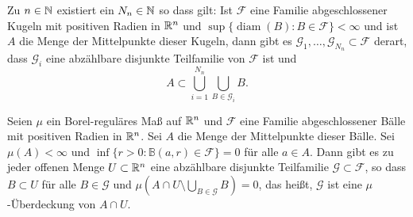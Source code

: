 \documentclass[a4paper,twoside,DIV15,BCOR12mm]{scrbook}
\DeclareMathOperator{\diam}{diam}
\begin{document}
\begin{satz}[Besicovitch]
\label{satz:2.8}
Zu $n\in\mathbb{N}$ existiert ein $N_n\in\mathbb{N}$ so dass gilt: Ist $\mathcal F$ eine Familie abgeschlossener Kugeln mit positiven Radien in $\mathbb{R}^n$ und $\sup\{\diam(B):B\in\mathcal F\}<\infty$ und ist $A$ die Menge der Mittelpunkte dieser Kugeln, dann gibt es $\mathcal G_1,\ldots,\mathcal G_{N_n}\subset \mathcal F$ derart, dass $\mathcal G_i$ eine abzählbare disjunkte Teilfamilie von $\mathcal F$ ist und
\[
A\subset \bigcup_{i=1}^{N_n} \bigcup_{B\in\mathcal G_i}B.
\]
\end{satz}

\begin{korollar}
\label{kor:2.9}
Seien $\mu$ ein Borel-reguläres Maß auf $\mathbb{R}^n$ und $\mathcal F$ eine Familie abgeschlossener Bälle mit positiven Radien in $\mathbb{R}^n$. Sei $A$ die Menge der Mittelpunkte dieser Bälle. Sei $\mu(A)<\infty$ und $\inf\{r>0: \mathbb B(a,r)\in\mathcal F\}=0$ für alle $a\in A$. Dann gibt es zu jeder offenen Menge $ U \subset\mathbb{R}^n$ eine abzählbare disjunkte Teilfamilie $\mathcal G\subset\mathcal F$, so dass $B\subset U$ für alle $B\in \mathcal G$ und $\mu(A\cap U \setminus \bigcup_{B\in\mathcal G}B)=0$, das heißt, $\mathcal G$ ist eine $\mu$-Überdeckung von $A\cap U$.
\end{korollar}
\end{document}
